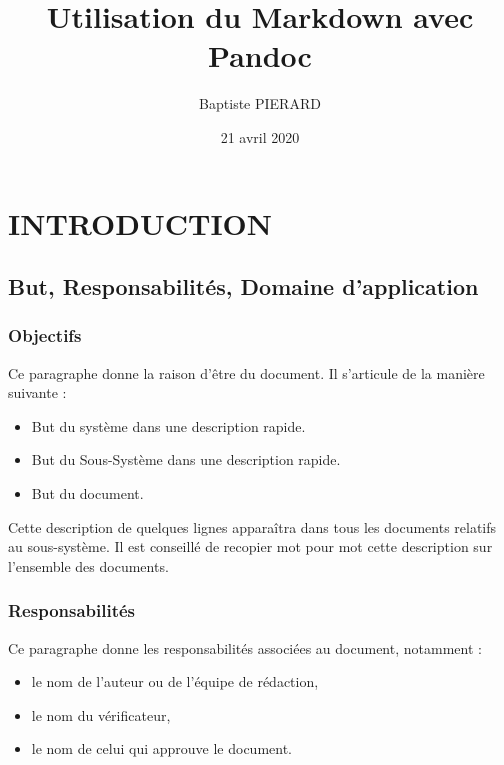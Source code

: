 \documentclass[
  10pt,
]{book}
\title{Utilisation du Markdown avec Pandoc}
\author{Baptiste PIERARD}
\date{21 avril 2020}
\providecommand{\tightlist}{%
  \setlength{\itemsep}{0pt}\setlength{\parskip}{0pt}}
\begin{document}
\frontmatter
\maketitle

{
\setcounter{tocdepth}{2}
\tableofcontents
}
\mainmatter
\hypertarget{introduction}{%
\section{INTRODUCTION}\label{introduction}}

\hypertarget{but-responsabilituxe9s-domaine-dapplication}{%
\subsection{But, Responsabilités, Domaine
d'application}\label{but-responsabilituxe9s-domaine-dapplication}}

\hypertarget{objectifs}{%
\subsubsection{Objectifs}\label{objectifs}}

Ce paragraphe donne la raison d'être du document. Il s'articule de la
manière suivante :

\begin{itemize}
\tightlist
\item
  But du système dans une description rapide.
\item
  But du Sous-Système dans une description rapide.
\item
  But du document.
\end{itemize}

Cette description de quelques lignes apparaîtra dans tous les documents
relatifs au sous-système. Il est conseillé de recopier mot pour mot
cette description sur l'ensemble des documents.

\hypertarget{responsabilituxe9s}{%
\subsubsection{Responsabilités}\label{responsabilituxe9s}}

Ce paragraphe donne les responsabilités associées au document, notamment
:

\begin{itemize}
\tightlist
\item
  le nom de l'auteur ou de l'équipe de rédaction,
\item
  le nom du vérificateur,
\item
  le nom de celui qui approuve le document.
\end{itemize}
\end{document}
